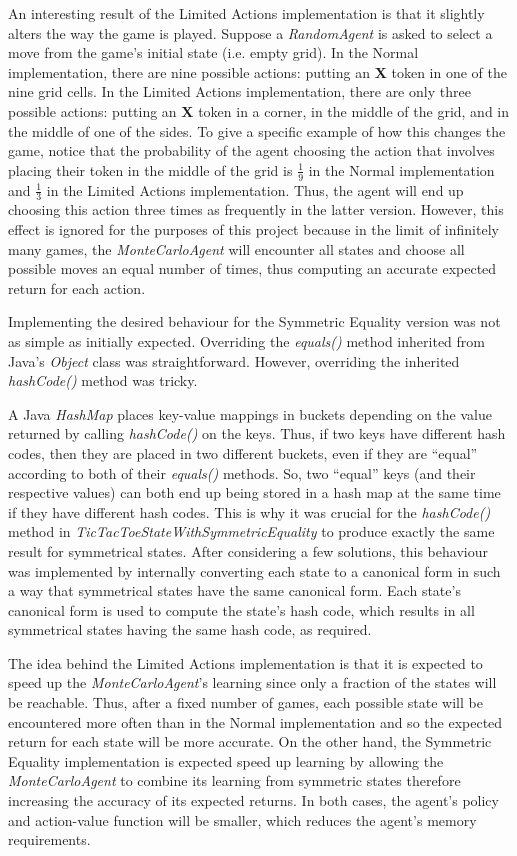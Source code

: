 \documentclass[11pt,a4paper]{report}
\begin{document}
An interesting result of the Limited Actions implementation is that it slightly alters the way the game is played. Suppose a \emph{RandomAgent} is asked to select a move from the game's initial state (i.e. empty grid). In the Normal implementation, there are nine possible actions: putting an \textbf{X} token in one of the nine grid cells. In the Limited Actions implementation, there are only three possible actions: putting an \textbf{X} token in a corner, in the middle of the grid, and in the middle of one of the sides. To give a specific example of how this changes the game, notice that the probability of the agent choosing the action that involves placing their token in the middle of the grid is $\frac{1}{9}$ in the Normal implementation and $\frac{1}{3}$ in the Limited Actions implementation. Thus, the agent will end up choosing this action three times as frequently in the latter version. However, this effect is ignored for the purposes of this project because in the limit of infinitely many games, the \emph{MonteCarloAgent} will encounter all states and choose all possible moves an equal number of times, thus computing an accurate expected return for each action.

Implementing the desired behaviour for the Symmetric Equality version was not as simple as initially expected. Overriding the \emph{equals()} method inherited from Java's \emph{Object} class was straightforward. However, overriding the inherited \emph{hashCode()} method was tricky.

A Java \emph{HashMap} places key-value mappings in buckets depending on the value returned by calling \emph{hashCode()} on the keys. Thus, if two keys have different hash codes, then they are placed in two different buckets, even if they are ``equal'' according to both of their \emph{equals()} methods. So, two ``equal'' keys (and their respective values) can both end up being stored in a hash map at the same time if they have different hash codes. This is why it was crucial for the \emph{hashCode()} method in \emph{TicTacToeStateWithSymmetricEquality} to produce exactly the same result for symmetrical states. After considering a few solutions, this behaviour was implemented by internally converting each state to a canonical form in such a way that symmetrical states have the same canonical form. Each state's canonical form is used to compute the state's hash code, which results in all symmetrical states having the same hash code, as required.

The idea behind the Limited Actions implementation is that it is expected to speed up the \emph{MonteCarloAgent}'s learning since only a fraction of the states will be reachable. Thus, after a fixed number of games, each possible state will be encountered more often than in the Normal implementation and so the expected return for each state will be more accurate. On the other hand, the Symmetric Equality implementation is expected speed up learning by allowing the \emph{MonteCarloAgent} to combine its learning from symmetric states therefore increasing the accuracy of its expected returns. In both cases, the agent's policy and action-value function will be smaller, which reduces the agent's memory requirements.
\end{document}
